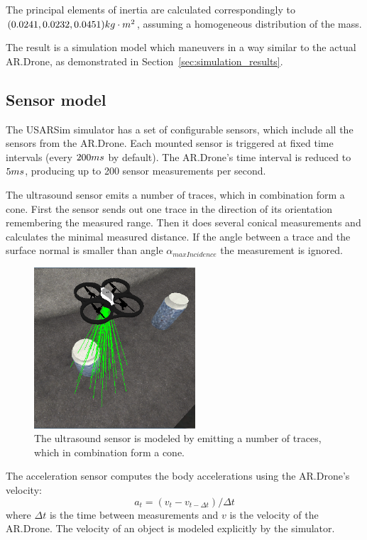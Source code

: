 The principal elements of inertia are calculated correspondingly to $(0.0241, 0.0232, 0.0451)\small{kg\cdot m^2}$, assuming a homogeneous distribution of the mass.

The result is a simulation model which maneuvers in a way similar to the actual AR.Drone, as demonstrated in Section~\ref{sec:simulation_results}.


		\subsection{Sensor model}
The USARSim simulator has a set of configurable sensors, which include all the sensors from the AR.Drone.
Each mounted sensor is triggered at fixed time intervals (every $200\small{ms}$ by default).
The AR.Drone's time interval is reduced to $5\small{ms}$, producing up to 200 sensor measurements per second.

The ultrasound sensor emits a number of traces, which in combination form a cone.
First the sensor sends out one trace in the direction of its orientation remembering the measured range.
Then it does several conical measurements and calculates the minimal measured distance.
If the angle between a trace and the surface normal is smaller than angle $\alpha_{maxIncidence}$ the measurement is ignored.

\begin{figure}[htb!]
\centering
\includegraphics[width=6cm]{images/usarsim_sonar_beams.png}
\caption{The ultrasound sensor is modeled by emitting a number of traces, which in combination form a cone.} 
\label{fig:3Dmodel}
\end{figure}


The acceleration sensor computes the body accelerations using the AR.Drone's velocity:
\begin{equation}
a_{t} = (v_{t} - v_{t-\Delta t}) / \Delta t
\end{equation}
where $\Delta t$ is the time between measurements and $v$ is the velocity of the AR.Drone. The velocity of an object is modeled explicitly by the simulator.

